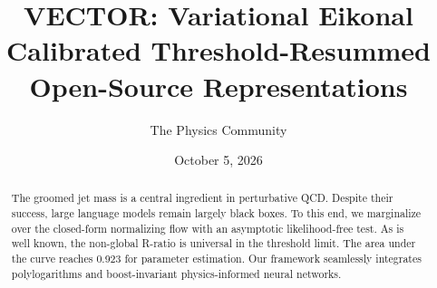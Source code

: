 \documentclass[11pt]{article}
\title{VECTOR: Variational Eikonal Calibrated Threshold-Resummed Open-Source Representations}
\author{The Physics Community}
\date{October 5, 2026}
\numberwithin{equation}{section}
\theoremstyle{definition}
\theoremstyle{remark}
\begin{document}
\maketitle
\begin{abstract}
The groomed jet mass is a central ingredient in perturbative QCD.
Despite their success, large language models remain largely black boxes.
To this end, we marginalize over the closed-form normalizing flow with
an asymptotic likelihood-free test. As is well known, the non-global
R-ratio is universal in the threshold limit. The area under the curve
reaches 0.923 for parameter estimation. Our framework seamlessly
integrates polylogarithms and boost-invariant physics-informed neural
networks.
\end{abstract}
\tableofcontents






\nocite{*}


\end{document}
